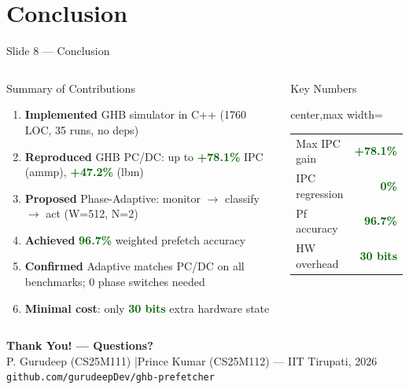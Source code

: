 \documentclass[aspectratio=169,t]{beamer}
\newcommand{\good}[1]{\textcolor{darkgreen}{\textbf{#1}}}
\begin{document}
\section{Conclusion}
\begin{frame}[shrink=5]{Slide 8 --- Conclusion}
\begin{columns}[T,totalwidth=\textwidth]
\begin{block}{Summary of Contributions}
\footnotesize
\begin{enumerate}\setlength\itemsep{2pt}
  \item \textbf{Implemented} GHB simulator in C++ (1760 LOC, 35 runs, no deps)
  \item \textbf{Reproduced} GHB PC/DC: up to \good{+78.1\%} IPC (ammp), \good{+47.2\%} (lbm)
  \item \textbf{Proposed} Phase-Adaptive: monitor $\rightarrow$ classify $\rightarrow$ act (W=512, N=2)
  \item \textbf{Achieved} \good{96.7\%} weighted prefetch accuracy
  \item \textbf{Confirmed} Adaptive matches PC/DC on all benchmarks; 0 phase switches needed
  \item \textbf{Minimal cost}: only \good{30 bits} extra hardware state
\end{enumerate}
\end{block}

\begin{exampleblock}{Key Numbers}
\footnotesize
\centering
\begin{adjustbox}{center,max width=\linewidth}
\begin{tabular}{@{}lr@{}}
\toprule
Max IPC gain  & \good{+78.1\%}\\
IPC regression & \good{0\%}\\
Pf accuracy   & \good{96.7\%}\\
HW overhead   & \good{30 bits}\\
\bottomrule
\end{tabular}
\end{adjustbox}
\end{exampleblock}
\end{columns}

\vspace{2pt}
\begin{center}
  \large\textbf{Thank You! --- Questions?}\\[2pt]
  \small P. Gurudeep (CS25M111) \quad|\quad Prince Kumar (CS25M112) --- IIT Tirupati, 2026\\[3pt]
  \footnotesize\texttt{github.com/gurudeepDev/ghb-prefetcher}
\end{center}
\end{frame}
\end{document}
